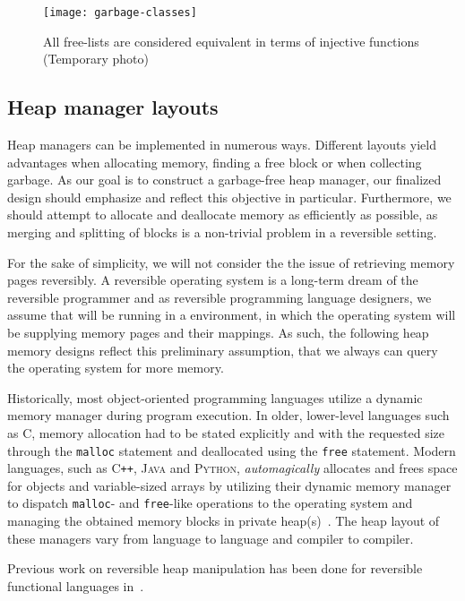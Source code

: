 \begin{figure}[ht]
\centering
\texttt{[image: garbage-classes]}
\caption{All free-lists are considered equivalent in terms of injective functions (Temporary photo)}
\label{fig:equivalent-free-lists}
\end{figure}


\subsection{Heap manager layouts}
\label{subsec-heap-manager-layout}
Heap managers can be implemented in numerous ways. Different layouts yield advantages when allocating memory, finding a free block or when collecting garbage. As our goal is to construct a garbage-free heap manager, our finalized design should emphasize and reflect this objective in particular. Furthermore, we should attempt to allocate and deallocate memory as efficiently as possible, as merging and splitting of blocks is a non-trivial problem in a reversible setting.

For the sake of simplicity, we will not consider the the issue of retrieving memory pages reversibly. A reversible operating system is a long-term dream of the reversible programmer and as reversible programming language designers, we assume that \rooplpp will be running in a  environment, in which the operating system will be supplying memory pages and their mappings. As such, the following heap memory designs reflect this preliminary assumption, that we always can query the operating system for more memory. 

Historically, most object-oriented programming languages utilize a dynamic memory manager during program execution. In older, lower-level languages such as \textsc{C}, memory allocation had to be stated explicitly and with the requested size through the \texttt{malloc} statement and deallocated using the \texttt{free} statement. Modern languages, such as \textsc{C\texttt{++}}, \textsc{Java} and \textsc{Python}, \textit{automagically} allocates and frees space for objects and variable-sized arrays by utilizing their dynamic memory manager to dispatch \texttt{malloc}- and \texttt{free}-like operations to the operating system and managing the obtained memory blocks in private heap(s)~\cite{wh:cpp_memory, bv:jvm, py:memory}. The heap layout of these managers vary from language to language and compiler to compiler.

Previous work on reversible heap manipulation has been done for reversible functional languages in~\cite{ha:heap, jsk:translation, tm:garbage}.

